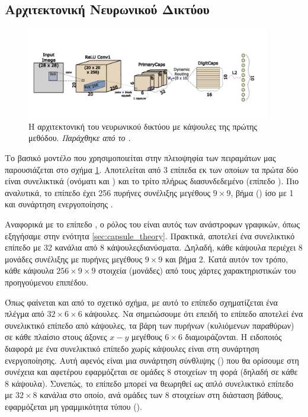 \subsection{Αρχιτεκτονική Νευρωνικού Δικτύου}

\begin{figure}[h]
    \centering
    \includegraphics[width=0.95\textwidth]{images/chapter method/first_method_architecture_encoder.pdf}
    \caption{Η αρχιτεκτονική του νευρωνικού δικτύου με κάψουλες της πρώτης μεθόδου. \textit{Παράχθηκε από το \href{https://inkscape.org/}{}}.}
    \label{fig:method_1_architecture}
  \end{figure}

Το βασικό μοντέλο που χρησιμοποιείται στην πλειοψηφία των πειραμάτων μας παρουσιάζεται στο σχήμα \ref{fig:method_1_architecture}. Αποτελείται από 3 επίπεδα εκ των οποίων τα πρώτα δύο είναι συνελικτικά (ονόματι  και ) και το τρίτο πλήρως διασυνδεδεμένο (επίπεδο ). Πιο αναλυτικά, το επίπεδο  έχει 256 πυρήνες συνέλιξης μεγέθους $9 \times 9$, βήμα () ίσο με 1 και συνάρτηση ενεργοποίησης .\par

Αναφορικά με το επίπεδο , ο ρόλος του είναι αυτός των ανάστροφων γραφικών, όπως εξηγήσαμε στην ενότητα \ref{sec:capsule_theory}. Πρακτικά, αποτελεί ένα συνελικτικό επίπεδο με 32 κανάλια από 8 κάψουλες\textendash διανύσματα. Δηλαδή, κάθε κάψουλα περιέχει 8 μονάδες συνέλιξης με πυρήνες μεγέθους $9 \times 9$ και βήμα 2. Κατά αυτόν τον τρόπο, κάθε κάψουλα  $256 \times 9 \times 9$ στοιχεία (μονάδες) από τους χάρτες χαρακτηριστικών του προηγούμενου επιπέδου.\par

Όπως φαίνεται και από το σχετικό σχήμα, με αυτό το επίπεδο σχηματίζεται ένα πλέγμα από $32 \times 6 \times 6$ κάψουλες. Να σημειώσουμε ότι επειδή το επίπεδο  αποτελεί ένα συνελικτικό επίπεδο από κάψουλες, τα βάρη των πυρήνων (κυλιόμενων παραθύρων) σε κάθε πλαίσιο στους άξονες $x-y$ μεγέθους $6 \times 6$ διαμοιράζονται. Η ειδοποιός διαφορά με ένα συνελικτικό επίπεδο χωρίς κάψουλες είναι στη συνάρτηση ενεργοποίησης. Αυτή αφενός είναι μια συνάρτηση σύνθλιψης () που θα ορίσουμε στη συνέχεια και αφετέρου εφαρμόζεται σε ομάδες 8 στοιχείων τη φορά (δηλαδή σε κάθε 8 κάψουλα). Συνεπώς, το επίπεδο  μπορεί να θεωρηθεί ως απλό συνελικτικό επίπεδο με $32 \times 8$ κανάλια στο οποίο, ανά ομάδες των 8 στοιχείων στη διάσταση βάθους, εφαρμόζεται μη γραμμικότητα τύπου  ().\par

